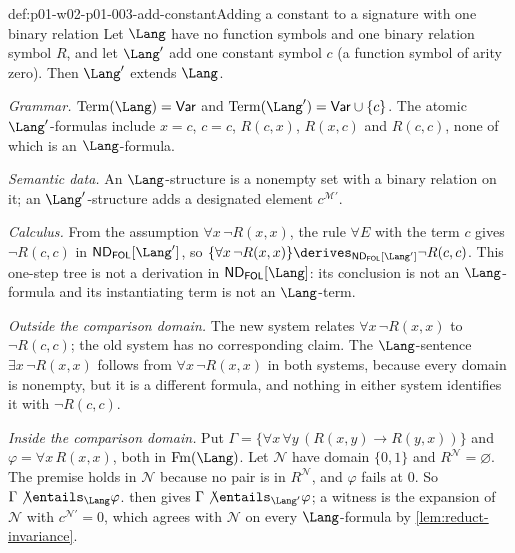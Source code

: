 \begin{hbexample}{def:p01-w02-p01-003-add-constant}{Adding a constant to a signature with one binary relation}
Let \(\Lang\) have no function symbols and one binary relation symbol
\(R\), and let \(\Lang'\) add one constant symbol \(c\) (a function symbol
of arity zero). Then \(\Lang'\) extends \(\Lang\).

\emph{Grammar.} \(\operatorname{Term}(\Lang)=\mathsf{Var}\) and
\(\operatorname{Term}(\Lang')=\mathsf{Var}\cup\{c\}\). The atomic
\(\Lang'\)-formulas include \(x=c\), \(c=c\), \(R(c,x)\), \(R(x,c)\) and
\(R(c,c)\), none of which is an \(\Lang\)-formula.

\emph{Semantic data.} An \(\Lang\)-structure is a nonempty set with a binary
relation on it; an \(\Lang'\)-structure adds a designated element
\(c^{\mathcal M'}\).

\emph{Calculus.} From the assumption \(\forall x\,\neg R(x,x)\), the rule
\(\forall E\) with the term \(c\) gives \(\neg R(c,c)\) in
\(\mathsf{ND}_{\mathsf{FOL}}[\Lang']\), so
\(\{\forall x\,\neg R(x,x)\}\derives_{\mathsf{ND}_{\mathsf{FOL}}[\Lang']}
\neg R(c,c)\). This one-step tree is not a derivation in
\(\mathsf{ND}_{\mathsf{FOL}}[\Lang]\): its conclusion is not an
\(\Lang\)-formula and its instantiating term is not an \(\Lang\)-term.

\emph{Outside the comparison domain.} The new system relates
\(\forall x\,\neg R(x,x)\) to \(\neg R(c,c)\); the old system has no
corresponding claim. The \(\Lang\)-sentence \(\exists x\,\neg R(x,x)\)
follows from \(\forall x\,\neg R(x,x)\) in both systems, because every
domain is nonempty, but it is a different formula, and nothing in either
system identifies it with \(\neg R(c,c)\).

\emph{Inside the comparison domain.} Put
\(\Gamma=\{\forall x\,\forall y\,(R(x,y)\to R(y,x))\}\) and
\(\varphi=\forall x\,R(x,x)\), both in \(\operatorname{Fm}(\Lang)\).
Let \(\mathcal N\) have domain \(\{0,1\}\) and
\(R^{\mathcal N}=\varnothing\). The premise holds in \(\mathcal N\) because
no pair is in \(R^{\mathcal N}\), and \(\varphi\) fails at \(0\). So
\(\Gamma\not\entails_{\Lang}\varphi\).
 then gives
\(\Gamma\not\entails_{\Lang'}\varphi\); a witness is the expansion of
\(\mathcal N\) with \(c^{\mathcal N'}=0\), which agrees with \(\mathcal N\)
on every \(\Lang\)-formula by \cref{lem:reduct-invariance}.
\end{hbexample}


